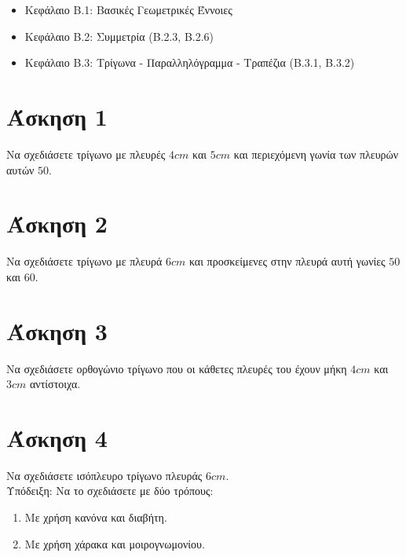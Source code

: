 \documentclass[a4paper,10pt]{report}
\begin{document}
\vspace{2em}
\begin{itemize}
\item Κεφάλαιο Β.1: Βασικές Γεωμετρικές Έννοιες
\item Κεφάλαιο Β.2: Συμμετρία (Β.2.3, Β.2.6)
\item Κεφάλαιο Β.3: Τρίγωνα - Παραλληλόγραμμα - Τραπέζια (Β.3.1, Β.3.2)
\end{itemize}


\section*{Άσκηση 1  \hfill \small{}}
Να σχεδιάσετε τρίγωνο με πλευρές $4cm$ και $5cm$ και περιεχόμενη γωνία των πλευρών αυτών $50$\textdegree .



\section*{Άσκηση 2  \hfill \small{}}
Να σχεδιάσετε τρίγωνο με πλευρά $6cm$ και προσκείμενες στην πλευρά αυτή γωνίες $50$\textdegree και $60$\textdegree .



\section*{Άσκηση 3  \hfill \small{}}
Να σχεδιάσετε ορθογώνιο τρίγωνο που οι κάθετες πλευρές του έχουν μήκη $4cm$ και $3cm$ αντίστοιχα.



\section*{Άσκηση 4  \hfill \small{}}
Να σχεδιάσετε ισόπλευρο τρίγωνο πλευράς $6cm$.\\
Υπόδειξη: Να το σχεδιάσετε με δύο τρόπους:
\begin{enumerate}
 \item Με χρήση κανόνα και διαβήτη.
 \item Με χρήση χάρακα και μοιρογνωμονίου.
\end{enumerate}
\end{document}
